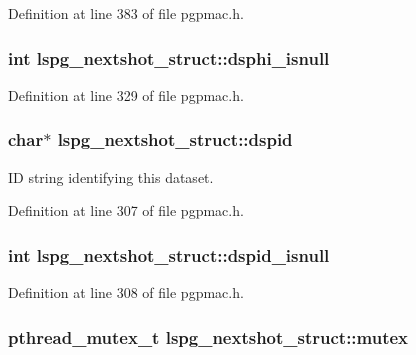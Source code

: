Definition at line 383 of file pgpmac.\-h.

\hypertarget{structlspg__nextshot__struct_a2d1f51cb1bb575a214344773136be878}{
\subsubsection[{dsphi\-\_\-isnull}]{\setlength{\rightskip}{0pt plus 5cm}int lspg\-\_\-nextshot\-\_\-struct\-::dsphi\-\_\-isnull}}\label{structlspg__nextshot__struct_a2d1f51cb1bb575a214344773136be878}


Definition at line 329 of file pgpmac.\-h.

\hypertarget{structlspg__nextshot__struct_a4487e718c2b55a8ab9ebb18329574ae1}{
\subsubsection[{dspid}]{\setlength{\rightskip}{0pt plus 5cm}char$\ast$ lspg\-\_\-nextshot\-\_\-struct\-::dspid}}\label{structlspg__nextshot__struct_a4487e718c2b55a8ab9ebb18329574ae1}


I\-D string identifying this dataset. 



Definition at line 307 of file pgpmac.\-h.

\hypertarget{structlspg__nextshot__struct_a7665485395487756ab448d0c81c84d10}{
\subsubsection[{dspid\-\_\-isnull}]{\setlength{\rightskip}{0pt plus 5cm}int lspg\-\_\-nextshot\-\_\-struct\-::dspid\-\_\-isnull}}\label{structlspg__nextshot__struct_a7665485395487756ab448d0c81c84d10}


Definition at line 308 of file pgpmac.\-h.

\hypertarget{structlspg__nextshot__struct_a38b657155fbee9b73278f76912cf2333}{
\subsubsection[{mutex}]{\setlength{\rightskip}{0pt plus 5cm}pthread\-\_\-mutex\-\_\-t lspg\-\_\-nextshot\-\_\-struct\-::mutex}}\label{structlspg__nextshot__struct_a38b657155fbee9b73278f76912cf2333}


